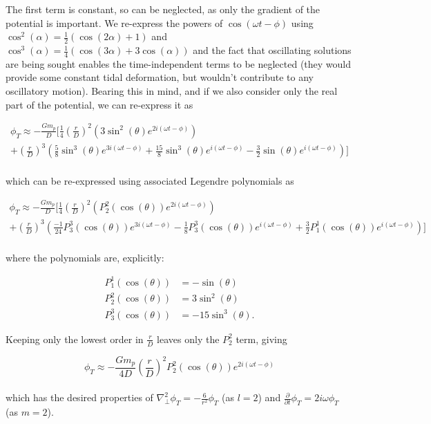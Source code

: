 \documentclass[11pt]{amsart}
\begin{document}
The first term is constant, so can be neglected, as only the gradient of the potential is important.
We re-express the powers of $\cos(\omega t - \phi)$ using $\cos^{2}(\alpha) = \frac{1}{2} (\cos(2\alpha) + 1)$ and $\cos^{3}(\alpha) = \frac{1}{4} (\cos(3\alpha) + 3 \cos(\alpha))$ 
and the fact that oscillating solutions are being sought enables the time-independent terms to be neglected (they would provide
some constant tidal deformation, but wouldn't contribute to any oscillatory motion).  Bearing this in mind, and if we also consider only the
real part of the potential, we can re-express it as

\begin{multline}
\phi_{T} \approx - \frac{G m_{p}}{D} \Big[
\frac{1}{4} \left( \frac{r}{D} \right)^{2} \left( 3 \sin^{2}(\theta) e^{2 i (\omega t - \phi)} \right)  \\
+ \left( \frac{r}{D} \right)^{3} \left( \frac{5}{8} \sin^{3}(\theta) e^{3 i (\omega t - \phi)} + \frac{15}{8} \sin^{3}(\theta) e^{i (\omega t - \phi)}  - \frac{3}{2} \sin (\theta) e^{i (\omega t - \phi)}\right)
\Big]
\end{multline}
\\
which can be re-expressed using associated Legendre polynomials as 

\begin{multline}
\phi_{T} \approx - \frac{G m_{p}}{D} \Big[
\frac{1}{4} \left( \frac{r}{D} \right)^{2} \left( P_{2}^{2} (\cos (\theta)) e^{2 i (\omega t - \phi)} \right)  \\
+ \left( \frac{r}{D} \right)^{3} \left( \frac{-1}{24} P_{3}^{3} (\cos (\theta)) e^{3 i (\omega t - \phi)} - \frac{1}{8} P_{3}^{3} (\cos (\theta)) e^{i (\omega t - \phi)}  + \frac{3}{2} P_{1}^{1} (\cos (\theta)) e^{i (\omega t - \phi)}\right)
\Big]
\end{multline}
\\
where the polynomials are, explicitly:

\begin{align}
P_{1}^{1} (\cos (\theta)) &= - \sin(\theta) \\
P_{2}^{2} (\cos (\theta)) &= 3 \sin^{2}(\theta) \\
P_{3}^{3} (\cos (\theta)) &= - 15 \sin^{3}(\theta).
\end{align}

Keeping only the lowest order in $\frac{r}{D}$ leaves only the $P_{2}^{2}$ term, giving

\begin{equation}
\phi_{T} \approx - \frac{G m_{p}}{4 D}  \left( \frac{r}{D} \right)^{2}  P_{2}^{2} (\cos (\theta)) e^{2 i (\omega t - \phi)} 
\end{equation}
\\
which has the desired properties of $\nabla_{\perp}^{2} \phi_{T} = - \frac{6}{r^2} \phi_{T}$ (as $l=2$) and $\frac{\partial}{\partial t} \phi_{T} = 2 i \omega \phi_{T}$ (as $m=2$).
\end{document}
